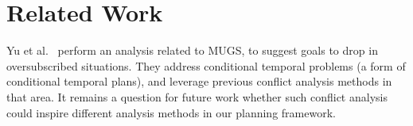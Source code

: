 \section{Related Work}
\label{related}




Yu et al.\  perform an analysis related to
MUGS, to suggest goals to drop in oversubscribed situations. They
address conditional temporal problems (a form of conditional temporal
plans), and leverage previous conflict analysis methods in that
area. It remains a question for future work whether such conflict
analysis could inspire different analysis methods in our planning
framework.






